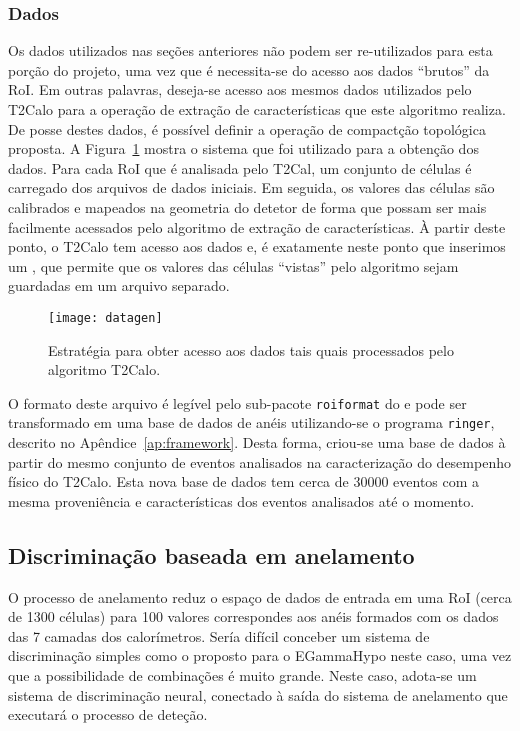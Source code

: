\subsubsection{Dados}

Os dados utilizados nas seções anteriores não podem ser re-utilizados para
esta porção do projeto, uma vez que é necessita-se do acesso aos dados
``brutos'' da RoI. Em outras palavras, deseja-se acesso aos mesmos dados
utilizados pelo T2Calo para a operação de extração de características que este
algoritmo realiza. De posse destes dados, é possível definir a operação de
compactção topológica proposta. A Figura~\ref{fig:datagen} mostra o sistema
que foi utilizado para a obtenção dos dados. Para cada RoI que é analisada
pelo T2Cal, um conjunto de células é carregado dos arquivos de dados
iniciais. Em seguida, os valores das células são calibrados e mapeados na
geometria do detetor de forma que possam ser mais facilmente acessados pelo
algoritmo de extração de características. À partir deste ponto, o T2Calo tem
acesso aos dados e, é exatamente neste ponto que inserimos um , que
permite que os valores das células ``vistas'' pelo algoritmo sejam guardadas
em um arquivo separado.

\begin{figure}
\begin{center}
\texttt{[image: datagen]}
\end{center}
\caption{Estratégia para obter acesso aos dados tais quais processados pelo
algoritmo T2Calo.}
\label{fig:datagen}
\end{figure}

O formato deste arquivo é legível pelo sub-pacote \texttt{roiformat} do
 e pode ser transformado em uma base de dados de anéis
utilizando-se o programa \texttt{ringer}, descrito no
Apêndice~\ref{ap:framework}. Desta forma, criou-se uma base de dados à partir
do mesmo conjunto de eventos analisados na caracterização do desempenho físico
do T2Calo. Esta nova base de dados tem cerca de $30000$ eventos com a mesma
proveniência e características dos eventos analisados até o momento.

\subsection{Discriminação baseada em anelamento}

O processo de anelamento reduz o espaço de dados de entrada em uma RoI (cerca
de 1300 células) para 100 valores correspondes aos anéis formados com os dados
das 7 camadas dos calorímetros. Sería difícil conceber um sistema de
discriminação simples como o proposto para o EGammaHypo neste caso, uma vez
que a possibilidade de combinações é muito grande. Neste caso, adota-se um
sistema de discriminação neural, conectado à saída do sistema de anelamento
que executará o processo de deteção.

